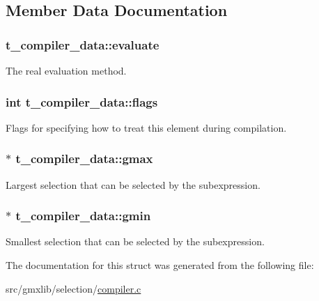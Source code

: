 \subsection{\-Member \-Data \-Documentation}
\hypertarget{structt__compiler__data_a131ed5a33c6fb7c00aeca41b2683319a}{
\subsubsection[{evaluate}]{ {\bf t\-\_\-compiler\-\_\-data\-::evaluate}}}\label{structt__compiler__data_a131ed5a33c6fb7c00aeca41b2683319a}
\-The real evaluation method. \hypertarget{structt__compiler__data_aca709f984aa145cd081a0da4a5c47ecc}{
\subsubsection[{flags}]{\setlength{\rightskip}{0pt plus 5cm}int {\bf t\-\_\-compiler\-\_\-data\-::flags}}}\label{structt__compiler__data_aca709f984aa145cd081a0da4a5c47ecc}
\-Flags for specifying how to treat this element during compilation. \hypertarget{structt__compiler__data_aec0dc8d1c9fd5d16402bd4f82544f8ab}{
\subsubsection[{gmax}]{$\ast$ {\bf t\-\_\-compiler\-\_\-data\-::gmax}}}\label{structt__compiler__data_aec0dc8d1c9fd5d16402bd4f82544f8ab}
\-Largest selection that can be selected by the subexpression. \hypertarget{structt__compiler__data_aa7582887488092293b01419c70a198da}{
\subsubsection[{gmin}]{$\ast$ {\bf t\-\_\-compiler\-\_\-data\-::gmin}}}\label{structt__compiler__data_aa7582887488092293b01419c70a198da}
\-Smallest selection that can be selected by the subexpression. 

\-The documentation for this struct was generated from the following file\-:\begin{DoxyCompactItemize}
\item 
src/gmxlib/selection/\hyperlink{compiler_8c}{compiler.\-c}\end{DoxyCompactItemize}
